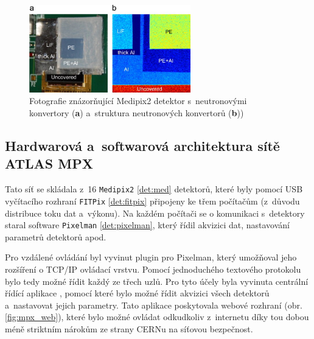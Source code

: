 \begin{figure}[ht]
	\begin{center}
		\includegraphics[width=7cm]{figures/mpx-layers.jpg}
		\caption{Fotografie znázorňující Medipix2 detektor s~neutronovými konvertory (\textbf{a}) a~struktura neutronových konvertorů (\textbf{b})) \cite{Vykydal200935}}
		\label{fig:mpx_lay}
	\end{center}
\end{figure}

\subsection{Hardwarová a~softwarová architektura sítě ATLAS MPX}
Tato síť se skládala z~16 \texttt{Medipix2} \ref{det:med} detektorů, které byly pomocí USB vyčítacího rozhraní \texttt{FITPix} \ref{det:fitpix} připojeny ke třem počítačům (z~důvodu distribuce toku dat a~výkonu). Na každém počítači se o komunikaci s~detektory staral software \texttt{Pixelman} \ref{det:pixelman}, který řídil akvizici dat, nastavování parametrů detektorů apod. 

Pro vzdálené ovládání byl vyvinut plugin pro Pixelman, který umožňoval jeho rozšíření o TCP/IP ovládací vrstvu. Pomocí jednoduchého textového protokolu bylo tedy možné řídit každý ze třech uzlů. Pro tyto účely byla vyvinuta centrální řídící aplikace \cite{Turecek2011S45}, pomocí které bylo možné řídit akvizici všech detektorů a~nastavovat jejich parametry. Tato aplikace poskytovala webové rozhraní (obr. \ref{fig:mpx_web}), které bylo možné ovládat odkudkoliv z~internetu díky tou dobou méně striktním nárokům ze strany CERNu na síťovou bezpečnost.

